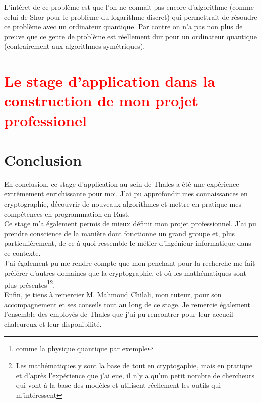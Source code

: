 \documentclass[a4paper, 12pt]{article}
\begin{document}
L'intéret de ce problème est que l'on ne connait pas encore d'algorithme (comme celui de Shor pour le problème du logarithme discret) qui permettrait de résoudre ce problème avec un ordinateur quantique. Par contre on n'a pas non plus de preuve que ce genre de problème est réellement dur pour un ordinateur quantique (contrairement aux algorithmes symétriques). 


\section{\textcolor{red}{Le stage d'application dans la construction de mon projet professionel}}
\section{Conclusion}
En conclusion, ce stage d'application au sein de Thales a été une expérience extrêmement enrichissante pour moi. J'ai pu approfondir mes connaissances en cryptographie, découvrir de nouveaux algorithmes et mettre en pratique mes compétences en programmation en Rust.\\

Ce stage m'a également permis de mieux définir mon projet professionnel. J'ai pu prendre conscience de la manière dont fonctionne un grand groupe et, plus particulièrement, de ce à quoi ressemble le métier d'ingénieur informatique dans ce contexte. \\J'ai également pu me rendre compte que mon penchant pour la recherche me fait préférer d'autres domaines que la cryptographie, et où les mathématiques sont plus présentes\footnote{comme la physique quantique par exemple}\footnote{Les mathématiques y sont la base de tout en cryptogaphie, mais en pratique et d'après l'expérience que j'ai eue, il n'y a qu'un petit nombre de chercheurs qui vont à la base des modèles et utilisent réellement les outils qui m'intéressent}. \\

Enfin, je tiens à remercier M. Mahmoud Chilali, mon tuteur, pour son accompagnement et ses conseils tout au long de ce stage. Je remercie également l'ensemble des employés de Thales que j'ai pu rencontrer pour leur accueil chaleureux et leur disponibilité.\printbibliography
\end{document}
